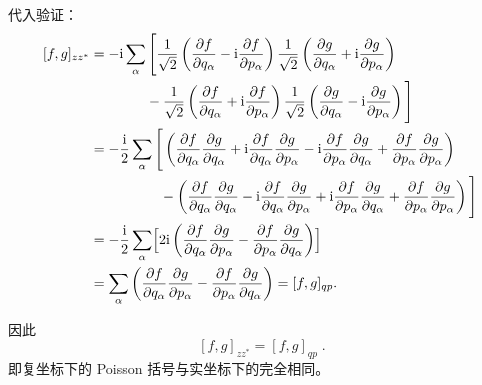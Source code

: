 \begin{question}
\begin{solution}
代入验证：
\[
\begin{aligned}
[f,g]_{zz^*}
&= -\mathrm i\sum_{\alpha}\Bigg[
\frac{1}{\sqrt2}\left(\frac{\partial f}{\partial q_\alpha}
-\mathrm i\frac{\partial f}{\partial p_\alpha}\right)
\frac{1}{\sqrt2}\left(\frac{\partial g}{\partial q_\alpha}
+\mathrm i\frac{\partial g}{\partial p_\alpha}\right) \\
&\qquad\qquad
-\frac{1}{\sqrt2}\left(\frac{\partial f}{\partial q_\alpha}
+\mathrm i\frac{\partial f}{\partial p_\alpha}\right)
\frac{1}{\sqrt2}\left(\frac{\partial g}{\partial q_\alpha}
-\mathrm i\frac{\partial g}{\partial p_\alpha}\right)
\Bigg] \\
&= -\frac{\mathrm i}{2}\sum_{\alpha}\Bigg[
\left(\frac{\partial f}{\partial q_\alpha}\frac{\partial g}{\partial q_\alpha}
+\mathrm i\frac{\partial f}{\partial q_\alpha}\frac{\partial g}{\partial p_\alpha}
-\mathrm i\frac{\partial f}{\partial p_\alpha}\frac{\partial g}{\partial q_\alpha}
+\frac{\partial f}{\partial p_\alpha}\frac{\partial g}{\partial p_\alpha}\right) \\
&\qquad\qquad\quad
-\left(\frac{\partial f}{\partial q_\alpha}\frac{\partial g}{\partial q_\alpha}
-\mathrm i\frac{\partial f}{\partial q_\alpha}\frac{\partial g}{\partial p_\alpha}
+\mathrm i\frac{\partial f}{\partial p_\alpha}\frac{\partial g}{\partial q_\alpha}
+\frac{\partial f}{\partial p_\alpha}\frac{\partial g}{\partial p_\alpha}\right)
\Bigg] \\
&= -\frac{\mathrm i}{2}\sum_{\alpha}
\Bigl[2\mathrm i\left(
\frac{\partial f}{\partial q_\alpha}\frac{\partial g}{\partial p_\alpha}
-\frac{\partial f}{\partial p_\alpha}\frac{\partial g}{\partial q_\alpha}
\right)\Bigr] \\
&= \sum_{\alpha}\left(
\frac{\partial f}{\partial q_\alpha}\frac{\partial g}{\partial p_\alpha}
-\frac{\partial f}{\partial p_\alpha}\frac{\partial g}{\partial q_\alpha}
\right) = [f,g]_{qp}.
\end{aligned}
\]

因此
\[
\boxed{\;[f,g]_{zz^*}=[f,g]_{qp}\;}.
\]
即复坐标下的 Poisson 括号与实坐标下的完全相同。
\end{solution}
\end{question}

